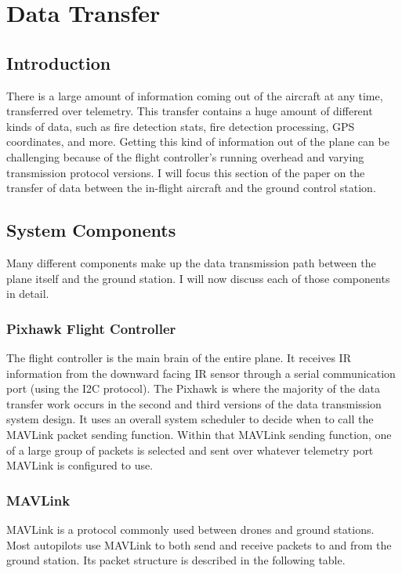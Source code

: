\documentclass[12pt,journal,compsoc]{IEEEtran}
\begin{document}
\section{Data Transfer}
\subsection{Introduction}
There is a large amount of information coming out of the aircraft at any time, transferred over telemetry. This transfer contains a huge amount of different kinds of data, such as fire detection stats, fire detection processing, GPS coordinates, and more. Getting this kind of information out of the plane can be challenging because of the flight controller's running overhead and varying transmission protocol versions. I will focus this section of the paper on the transfer of data between the in-flight aircraft and the ground control station.

\subsection{System Components}
Many different components make up the data transmission path between the plane itself and the ground station. I will now discuss each of those components in detail.

\subsubsection{Pixhawk Flight Controller}
The flight controller is the main brain of the entire plane. It receives IR information from the downward facing IR sensor through a serial communication port (using the I2C protocol). The Pixhawk is where the majority of the data transfer work occurs in the second and third versions of the data transmission system design. It uses an overall system scheduler to decide when to call the MAVLink packet sending function. Within that MAVLink sending function, one of a large group of packets is selected and sent over whatever telemetry port MAVLink is configured to use.

\subsubsection{MAVLink}
MAVLink is a protocol commonly used between drones and ground stations. Most autopilots use MAVLink to both send and receive packets to and from the ground station. Its packet structure is described in the following table.
\end{document}

